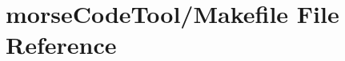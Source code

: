 \hypertarget{docs_2morseCodeTool_2Makefile}{}\section{morse\+Code\+Tool/\+Makefile File Reference}
\label{docs_2morseCodeTool_2Makefile}
